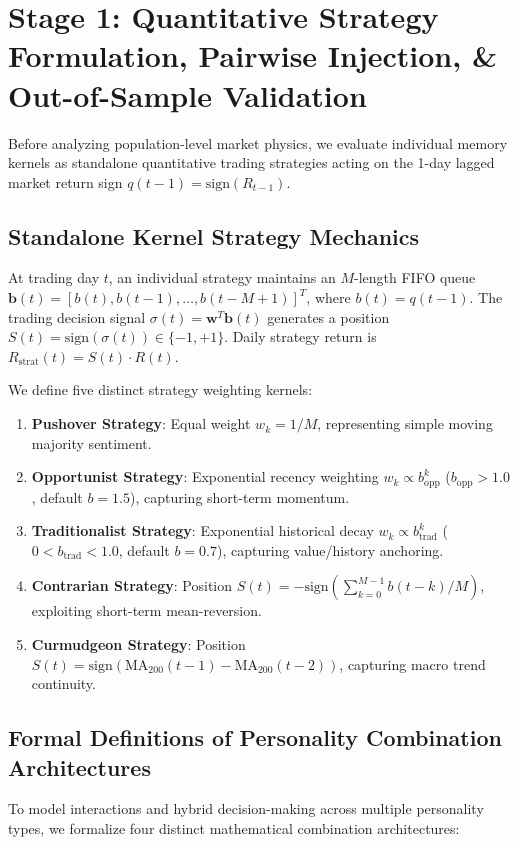 \documentclass[11pt,a4paper]{article}
\begin{document}
\section{Stage 1: Quantitative Strategy Formulation, Pairwise Injection, \& Out-of-Sample Validation}

Before analyzing population-level market physics, we evaluate individual memory kernels as standalone quantitative trading strategies acting on the 1-day lagged market return sign $q(t-1) = \text{sign}(R_{t-1})$.

\subsection{Standalone Kernel Strategy Mechanics}
At trading day $t$, an individual strategy maintains an $M$-length FIFO queue $\mathbf{b}(t) = [b(t), b(t-1), \dots, b(t-M+1)]^T$, where $b(t) = q(t-1)$. The trading decision signal $\sigma(t) = \mathbf{w}^T \mathbf{b}(t)$ generates a position $S(t) = \text{sign}(\sigma(t)) \in \{-1, +1\}$. Daily strategy return is $R_{\text{strat}}(t) = S(t) \cdot R(t)$.

We define five distinct strategy weighting kernels:
\begin{enumerate}
    \item \textbf{Pushover Strategy}: Equal weight $w_k = 1/M$, representing simple moving majority sentiment.
    \item \textbf{Opportunist Strategy}: Exponential recency weighting $w_k \propto b_{\text{opp}}^k$ ($b_{\text{opp}} > 1.0$, default $b=1.5$), capturing short-term momentum.
    \item \textbf{Traditionalist Strategy}: Exponential historical decay $w_k \propto b_{\text{trad}}^k$ ($0 < b_{\text{trad}} < 1.0$, default $b=0.7$), capturing value/history anchoring.
    \item \textbf{Contrarian Strategy}: Position $S(t) = -\text{sign}(\sum_{k=0}^{M-1} b(t-k)/M)$, exploiting short-term mean-reversion.
    \item \textbf{Curmudgeon Strategy}: Position $S(t) = \text{sign}(\text{MA}_{200}(t-1) - \text{MA}_{200}(t-2))$, capturing macro trend continuity.
\end{enumerate}

\subsection{Formal Definitions of Personality Combination Architectures}
To model interactions and hybrid decision-making across multiple personality types, we formalize four distinct mathematical combination architectures:
\end{document}
